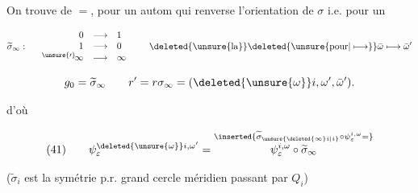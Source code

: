 On trouve de $=$, pour un autom qui renverse l'orientation de $\sigma$ i.e. pour un

\[\widetilde\sigma_\infty:\quad\begin{array}{rcl}0&\longrightarrow&1\\1&\longrightarrow&0\\{}^{\unsure{\prime}}\!\infty&\longrightarrow&\infty\end{array}\qquad\deleted{\unsure{\text{la}}}\deleted{\unsure{\text{pour}|\longmapsto}}\bar\omega\longmapsto\bar\omega'\]

\deleted{$\unsure{\widetilde\sigma_\infty}$}

\[g_0=\widetilde\sigma_\infty\qquad r'=r\sigma_\infty=(\deleted{\unsure{\omega}}i,\omega',\bar\omega').\]

d'où

\[(41)\qquad\psi_\varepsilon^{\deleted{\unsure{\omega}}i,\omega'}=\overset{\inserted{\widetilde\sigma_{\unsure{\deleted{\infty}i|i}}\circ\psi_\varepsilon^{i,\omega}=}}{\psi_\varepsilon^{i,\omega}\circ\widetilde\sigma_\infty}\]

($\widetilde\sigma_i$ est la symétrie p.r.  grand cercle méridien passant par $Q_i$)


